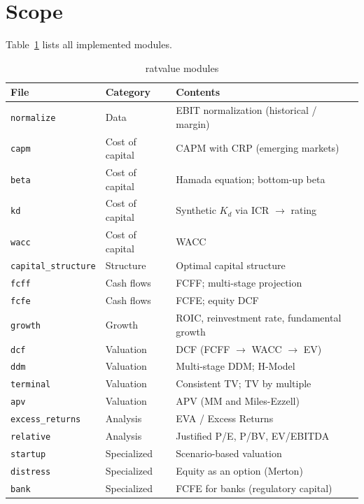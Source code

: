 \documentclass[12pt, a4paper, oneside]{book}
\newcommand{\Kd}{K_d}
\begin{document}
\section{Scope}

Table~\ref{tab:modulos} lists all implemented modules.

\begin{table}[h]
\centering
\caption{ratvalue modules}
\label{tab:modulos}
\begin{tabularx}{\textwidth}{llX}
\toprule
\textbf{File} & \textbf{Category} & \textbf{Contents} \\
\midrule
\texttt{normalize} & Data & EBIT normalization (historical / margin) \\
\texttt{capm}      & Cost of capital & CAPM with CRP (emerging markets) \\
\texttt{beta}      & Cost of capital & Hamada equation; bottom-up beta \\
\texttt{kd}        & Cost of capital & Synthetic $\Kd$ via ICR $\to$ rating \\
\texttt{wacc}      & Cost of capital & WACC \\
\texttt{capital\_structure} & Structure & Optimal capital structure \\
\texttt{fcff}      & Cash flows & FCFF; multi-stage projection \\
\texttt{fcfe}      & Cash flows & FCFE; equity DCF \\
\texttt{growth}    & Growth & ROIC, reinvestment rate, fundamental growth \\
\texttt{dcf}       & Valuation & DCF (FCFF $\to$ WACC $\to$ EV) \\
\texttt{ddm}       & Valuation & Multi-stage DDM; H-Model \\
\texttt{terminal}  & Valuation & Consistent TV; TV by multiple \\
\texttt{apv}       & Valuation & APV (MM and Miles-Ezzell) \\
\texttt{excess\_returns} & Analysis & EVA / Excess Returns \\
\texttt{relative}  & Analysis & Justified P/E, P/BV, EV/EBITDA \\
\texttt{startup}   & Specialized & Scenario-based valuation \\
\texttt{distress}  & Specialized & Equity as an option (Merton) \\
\texttt{bank}      & Specialized & FCFE for banks (regulatory capital) \\
\bottomrule
\end{tabularx}
\end{table}
\end{document}
